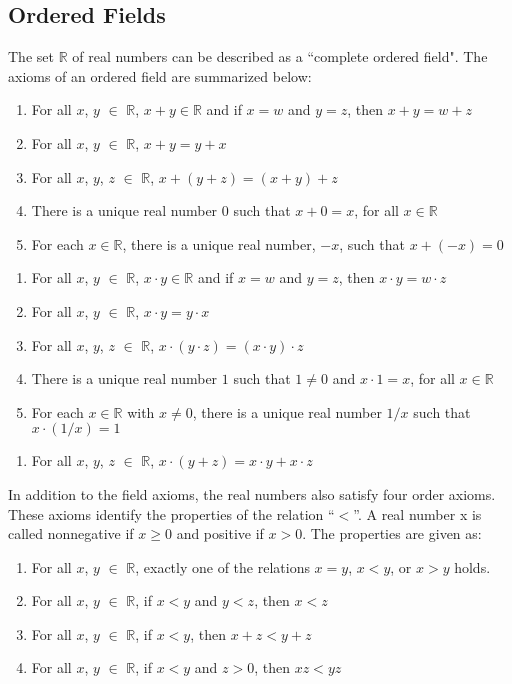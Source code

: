 \documentclass[11pt]{article}
\newcommand{\R}{\mathbb{R}}
\begin{document}
\subsection{Ordered Fields}
The set $\R$ of real numbers can be described as a ``complete ordered field". The axioms of an ordered field are summarized below:
\begin{enumerate}[label = A\arabic*.]
\item For all $x$, $y$ $\in$ $\R$, $ x+y \in \R$ and if $x=w$ and $y=z$, then $x+y = w+z$
\item For all $x$, $y$ $\in$ $\R$,  $x+y = y+x$
\item For all $x$, $y$, $z$ $\in$ $\R$,  $x+(y +z) = (x+y)+z$
\item There is a unique real number $0$ such that $x + 0 = x$, for all $x \in \R$
\item For each $x \in \R$, there is a unique real number, $-x$, such that $x + (-x) = 0$ 
\end{enumerate}
\begin{enumerate}[label = M\arabic*.]
\item For all $x$, $y$ $\in$ $\R$, $ x\cdot y \in \R$ and if $x=w$ and $y=z$, then $x\cdot y = w \cdot z$
\item For all $x$, $y$ $\in$ $\R$,  $x\cdot y = y \cdot x$
\item For all $x$, $y$, $z$ $\in$ $\R$,  $x \cdot (y \cdot z) = (x \cdot y) \cdot z$
\item There is a unique real number $1$ such that $1\neq0$ and $x \cdot 1 = x$, for all $x \in \R$
\item For each $x \in \R$ with $x \neq 0$, there is a unique real number $1/x$ such that $x \cdot (1/x) =1 $
\end{enumerate}
\begin{enumerate}[label = DL.]
\item For all $x$, $y$, $z$ $\in$ $\R$,  $x \cdot (y+z) = x\cdot y + x\cdot z$
\end{enumerate}
In addition to the field axioms, the real numbers also satisfy four order axioms. These axioms identify the properties of the relation ``$<$”. A real number x is called nonnegative if $x \geq 0$ and positive if $x > 0$. The properties are given as:
\begin{enumerate}[label = O\arabic*.]
\item For all $x$, $y$ $\in$ $\R$,  exactly one of the relations $x=y$, $x<y$, or $x>y$ holds.
\item For all $x$, $y$ $\in$ $\R$,  if $x<y$ and $y<z$, then $x<z$
\item For all $x$, $y$ $\in$ $\R$,  if $x<y$, then $x+z<y+z$
\item For all $x$, $y$ $\in$ $\R$,  if $x<y$ and $z>0$, then $xz<yz$
\end{enumerate}
\end{document}
